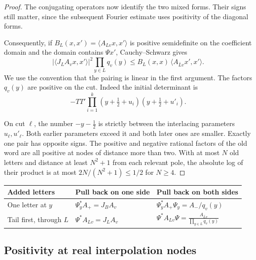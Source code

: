 \begin{proof}
The conjugating operators now identify the two mixed forms. Their signs still matter, since the subsequent Fourier estimate uses positivity of the diagonal forms.


Consequently, if \(B_L(x,x')=\langle A_{Lv}x,x'\rangle\)
is positive semidefinite on the coefficient domain and
the domain contains \(\Psi x'\), Cauchy--Schwarz gives
\begin{equation}\label{eq:word-size}
 \big|\langle J_L A_v x,x'\rangle\big|^2
     \prod_{y\in L}q_v(y)
 \le B_L(x,x)\,\langle A_{\bar L v}x',x'\rangle .
\end{equation}
We use the convention that the pairing is linear in the first
argument. The factors \(q_v(y)\) are positive on the cut.
Indeed the initial determinant is
\[
 -TT'\prod_{i=1}^k
   (y+\tfrac12+u_i)(y+\tfrac12+u'_i).
\]

On cut \(\ell\), the number \(-y-\tfrac12\) is strictly
between the interlacing parameters \(u_\ell,u'_\ell\).
Both earlier parameters exceed it and both later ones
are smaller. Exactly one pair has opposite signs.
The positive and negative rational factors of the old word
are all positive at nodes of distance more than two.
With at most \(N\) old letters and distance at least
\(N^2+1\) from each relevant pole, the absolute log of their
product is at most \(2N/(N^2+1)\le1/2\) for \(N\ge4\).

\end{proof}

\begin{construction}
\begin{tabular}{@{}lll@{}}\toprule
Added letters & Pull back on one side & Pull back on both sides\\\midrule
One letter at \(y\) & \(\Psi_y^* A_+=J_B A_v\) &
\(\Psi_y^* A_+\Psi_y=A_-/q_v(y)\)\\
Tail first, through \(L\) & \(\Psi^* A_{Lv}=J_L A_v\) &
\(\displaystyle\Psi^* A_{Lv}\Psi=
 \frac{A_{\bar L v}}{\prod_{y\in L}q_v(y)}\)\\\bottomrule
\end{tabular}
\caption{Changing the signs of letters at separated admissible nodes. The two columns give the mixed and diagonal forms used in the positive-block inequality.}\label{fig:pullback-of-word-forms}
\end{construction}

\subsection{Positivity at real interpolation nodes}

